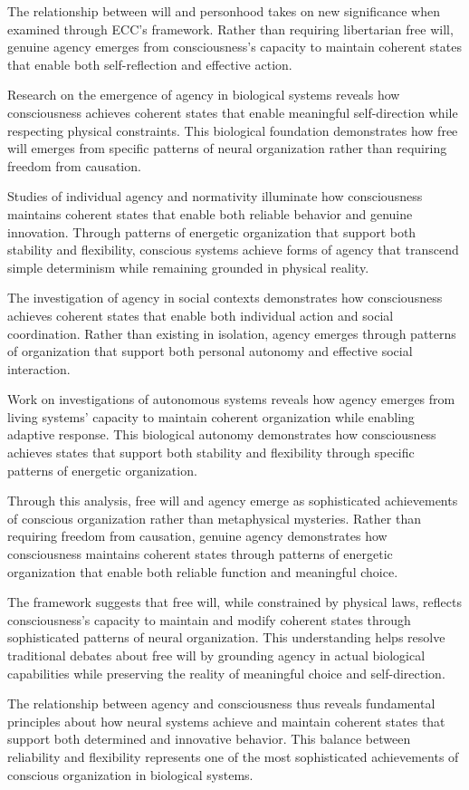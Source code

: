 The relationship between will and personhood \cite{Frankfurt1971} takes on new significance when examined through ECC's framework. Rather than requiring libertarian free will, genuine agency emerges from consciousness's capacity to maintain coherent states that enable both self-reflection and effective action.

Research on the emergence of agency in biological systems \cite{Barandiaran2009} reveals how consciousness achieves coherent states that enable meaningful self-direction while respecting physical constraints. This biological foundation demonstrates how free will emerges from specific patterns of neural organization rather than requiring freedom from causation.

Studies of individual agency and normativity \cite{Taylor1985} illuminate how consciousness maintains coherent states that enable both reliable behavior and genuine innovation. Through patterns of energetic organization that support both stability and flexibility, conscious systems achieve forms of agency that transcend simple determinism while remaining grounded in physical reality.

The investigation of agency in social contexts \cite{Bandura2001} demonstrates how consciousness achieves coherent states that enable both individual action and social coordination. Rather than existing in isolation, agency emerges through patterns of organization that support both personal autonomy and effective social interaction.

Work on investigations of autonomous systems \cite{Kauffman2000} reveals how agency emerges from living systems' capacity to maintain coherent organization while enabling adaptive response. This biological autonomy demonstrates how consciousness achieves states that support both stability and flexibility through specific patterns of energetic organization.

Through this analysis, free will and agency emerge as sophisticated achievements of conscious organization rather than metaphysical mysteries. Rather than requiring freedom from causation, genuine agency demonstrates how consciousness maintains coherent states through patterns of energetic organization that enable both reliable function and meaningful choice.

The framework suggests that free will, while constrained by physical laws, reflects consciousness's capacity to maintain and modify coherent states through sophisticated patterns of neural organization. This understanding helps resolve traditional debates about free will by grounding agency in actual biological capabilities while preserving the reality of meaningful choice and self-direction.

The relationship between agency and consciousness thus reveals fundamental principles about how neural systems achieve and maintain coherent states that support both determined and innovative behavior. This balance between reliability and flexibility represents one of the most sophisticated achievements of conscious organization in biological systems.